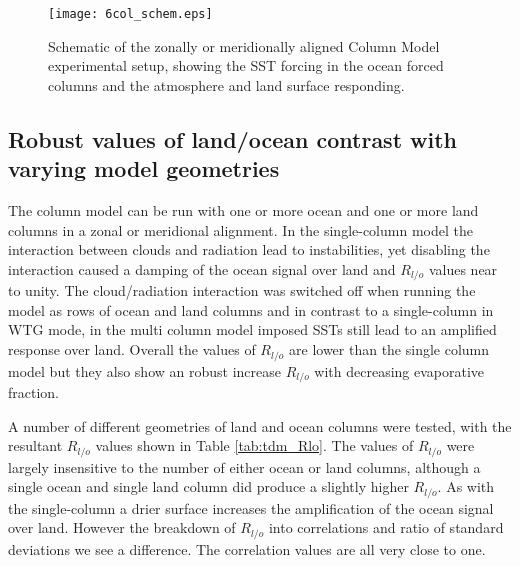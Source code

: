 \begin{figure}[ht]
\texttt{[image: 6col\_schem.eps]}
\caption{Schematic of the zonally or meridionally aligned Column Model 
experimental setup, showing the SST forcing in the ocean forced columns and the 
atmosphere and land surface responding.}
\label{fig:6cmschem}
\end{figure}

\subsection{Robust values of land/ocean contrast with varying model geometries}

The column model can be run with one or more ocean and one or more land columns 
in a zonal or meridional alignment. In the single-column model the interaction 
between clouds and radiation lead to instabilities, yet disabling the 
interaction caused a damping of the ocean signal over land and $R_{l/o}$ values 
near to unity. The cloud/radiation interaction was switched off when running the 
model as rows of ocean and land columns and in contrast to a single-column in 
WTG mode, in the multi column model imposed SSTs still lead to an amplified 
response over land. Overall the values of $R_{l/o}$ are lower than the single 
column model but they also show an robust increase $R_{l/o}$ with decreasing 
evaporative fraction.   

A number of different geometries of land and ocean columns were tested, with the 
resultant $R_{l/o}$ values shown in Table \ref{tab:tdm_Rlo}. The values of 
$R_{l/o}$ were largely insensitive to the number of either ocean or land 
columns, although a single ocean and single land column did produce a slightly 
higher $R_{l/o}$. As with the single-column a drier surface increases the 
amplification of the ocean signal over land. However the breakdown of $R_{l/o}$ 
into correlations and ratio of standard deviations we see a difference. The 
correlation values are all very close to one.


